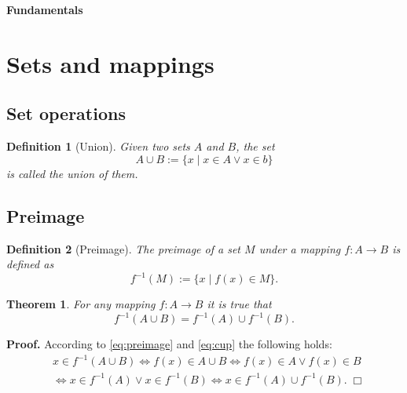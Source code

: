 \documentclass[a4paper,fleqn,10pt]{scrartcl}
\newcommand{\strong}[1]{\textsf{\textbf{#1}}}
\theoremstyle{rmbox}
\newtheorem{definition}{Definition}
\newtheorem{theorem}{Theorem}
\begin{document}
\thispagestyle{empty}

\noindent
{\huge\bfseries Fundamentals}

\tableofcontents

\section{Sets and mappings}

\subsection{Set operations}

\begin{definition}[Union]
Given two sets $A$ and $B$, the set
\begin{equation}\label{eq:cup}
A\cup B := \{x\mid x\in A\lor x\in b\}
\end{equation}
is called the \emph{union} of them.
\end{definition}


\subsection{Preimage}

\begin{definition}[Preimage]
The \emph{preimage} of a set $M$ under a mapping
$f\colon A\to B$ is defined as
\begin{equation}\label{eq:preimage}
f^{-1}(M) := \{x\mid f(x)\in M\}.
\end{equation}
\end{definition}

\begin{theorem}
For any mapping $f\colon A\to B$ it is true that
\begin{equation}
f^{-1}(A\cup B) = f^{-1}(A)\cup f^{-1}(B).
\end{equation}
\end{theorem}

\noindent
\strong{Proof.} According to \eqref{eq:preimage} and \eqref{eq:cup}
the following holds:
\begin{align}
&x\in f^{-1}(A\cup B)\iff f(x)\in A\cup B
\iff f(x)\in A\lor f(x)\in B\\
&\iff x\in f^{-1}(A)\lor x\in f^{-1}(B)
\iff x\in f^{-1}(A)\cup f^{-1}(B).\;\Box
\end{align}
\end{document}

